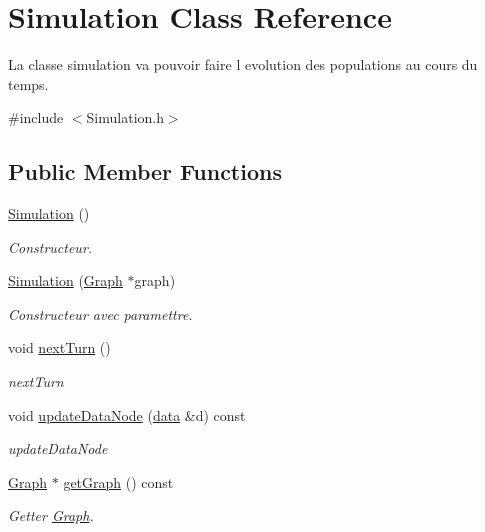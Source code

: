\hypertarget{class_simulation}{}\section{Simulation Class Reference}
\label{class_simulation}


La classe simulation va pouvoir faire l evolution des populations au cours du temps.  




{\ttfamily \#include $<$Simulation.\+h$>$}

\subsection*{Public Member Functions}
\begin{DoxyCompactItemize}
\item 
\mbox{\hyperlink{class_simulation_a5b224cc5b36bcc8eb29689aff223de41}{Simulation}} ()
\begin{DoxyCompactList}\small\item\em Constructeur. \end{DoxyCompactList}\item 
\mbox{\hyperlink{class_simulation_acac8de557d6db1b0c1ea78b8043b5271}{Simulation}} (\mbox{\hyperlink{class_graph}{Graph}} $\ast$graph)
\begin{DoxyCompactList}\small\item\em Constructeur avec paramettre. \end{DoxyCompactList}\item 
void \mbox{\hyperlink{class_simulation_a37a0a4dc49da67e14a09c650412d0a6e}{next\+Turn}} ()
\begin{DoxyCompactList}\small\item\em next\+Turn \end{DoxyCompactList}\item 
void \mbox{\hyperlink{class_simulation_aef637346a3cf4fc4c5f807f2b5bbae61}{update\+Data\+Node}} (\mbox{\hyperlink{_graph_8h_a98cbe1f79429fc62806b32b6e8871d9e}{data}} \&d) const
\begin{DoxyCompactList}\small\item\em update\+Data\+Node \end{DoxyCompactList}\item 
\mbox{\hyperlink{class_graph}{Graph}} $\ast$ \mbox{\hyperlink{class_simulation_a54d69f514110813e7ede41b6c8c9c707}{get\+Graph}} () const
\begin{DoxyCompactList}\small\item\em Getter \mbox{\hyperlink{class_graph}{Graph}}. \end{DoxyCompactList}\item 

\end{DoxyCompactItemize}
